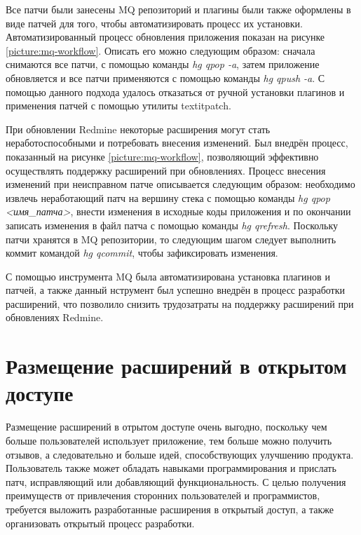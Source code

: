 Все патчи были занесены MQ репозиторий и плагины были также оформлены в виде
патчей для того, чтобы автоматизировать процесс их установки.
Автоматизированный процесс обновления приложения показан на рисунке
\ref{picture:mq-workflow}. Описать его можно следующим образом: сначала
снимаются все патчи, с помощью команды \textit{hg qpop -a}, затем приложение
обновляется и все патчи применяются с помощью команды \textit{hg qpush -a}. С
помощью данного подхода удалось отказаться от ручной установки плагинов и
применения патчей с помощью утилиты textit{patch}.

При обновлении Redmine некоторые расширения могут стать неработоспособными и
потребовать внесения изменений. Был внедрён процесс, показанный на рисунке
\ref{picture:mq-workflow}, позволяющий эффективно осуществлять поддержку
расширений при обновлениях. Процесс внесения изменений при неисправном патче
описывается следующим образом: необходимо извлечь неработающий патч на вершину
стека с помощью команды \textit{hg qpop <имя\_патча>}, внести изменения в
исходные коды приложения и по окончании записать изменения в файл патча с
помощью команды \textit{hg qrefresh}. Поскольку патчи хранятся в MQ
репозитории, то следующим шагом следует выполнить коммит командой \textit{hg
qcommit}, чтобы зафиксировать изменения.

С помощью инструмента MQ была автоматизирована установка плагинов и патчей, а
также данный нструмент был успешно внедрён в процесс разработки расширений,
что позволило снизить трудозатраты на поддержку расширений при обновлениях
Redmine.

\section{Размещение расширений в открытом доступе}
Размещение расширений в отрытом доступе очень выгодно, поскольку чем больше
пользователей использует приложение, тем больше можно получить отзывов, а
следовательно и больше идей, способствующих улучшению продукта.
Пользователь также может обладать навыками программирования и прислать патч,
исправляющий или добавляющий функциональность. С целью получения преимуществ от
привлечения сторонних пользователей и программистов, требуется выложить
разработанные расширения в открытый доступ, а также организовать открытый
процесс разработки.


